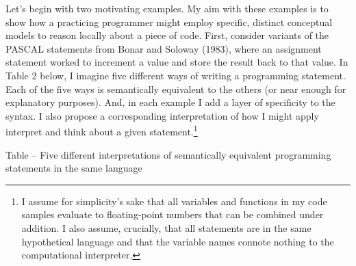 Let's begin with two motivating examples. My aim with these examples is
to show how a practicing programmer might employ specific, distinct
conceptual models to reason locally about a piece of code. First,
consider variants of the PASCAL statements from Bonar and Soloway
(1983), where an assignment statement worked to increment a value and
store the result back to that value. In Table 2 below, I imagine five
different ways of writing a programming statement. Each of the five ways
is semantically equivalent to the others (or near enough for explanatory
purposes). And, in each example I add a layer of specificity to the
syntax. I also propose a corresponding interpretation of how I might
apply interpret and think about a given statement.\footnote{I assume for
  simplicity's sake that all variables and functions in my code samples
  evaluate to floating-point numbers that can be combined under
  addition. I also assume, crucially, that all statements are in the
  same hypothetical language and that the variable names connote nothing
  to the computational interpreter.}

\protect\hypertarget{ux5fToc252445956}{}{}Table -- Five different
interpretations of semantically equivalent programming statements in the
same language

